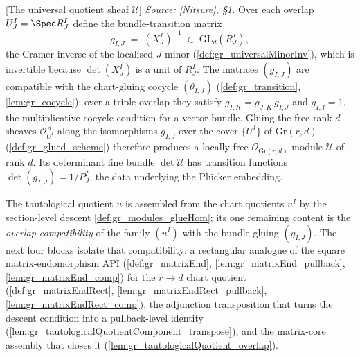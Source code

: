 \begin{definition}

[The universal quotient sheaf \(\mathcal{U}\)]
  \label{def:gr_universal_quotient_sheaf}
  \textit{Source: [Nitsure], \S 1.}
  Over each overlap \(U^I_J = \Spec R^I_J\) define the bundle-transition matrix
  \[
    g_{I,J} \;=\; (X^I_J)^{-1} \;\in\; \mathrm{GL}_d(R^I_J),
  \]
  the Cramer inverse of the localised \(J\)-minor (\cref{def:gr_universalMinorInv}),
  which is invertible because \(\det(X^I_J)\) is a unit of \(R^I_J\). The matrices
  \((g_{I,J})\) are compatible with the chart-gluing cocycle \((\theta_{I,J})\)
  (\cref{def:gr_transition}, \cref{lem:gr_cocycle}): over a triple overlap they
  satisfy \(g_{I,K} = g_{J,K}\, g_{I,J}\) and \(g_{I,I} = 1\), the multiplicative
  cocycle condition for a vector bundle. Gluing the free rank-\(d\) sheaves
  \(\mathcal{O}_{U^I}^{\,d}\) along the isomorphisms \(g_{I,J}\) over the cover
  \(\{U^I\}\) of \(\mathrm{Gr}(r,d)\) (\cref{def:gr_glued_scheme}) therefore
  produces a locally free \(\mathcal{O}_{\mathrm{Gr}(r,d)}\)-module
  \(\mathcal{U}\) of rank \(d\). Its determinant line bundle \(\det \mathcal{U}\)
  has transition functions \(\det(g_{I,J}) = 1/P^I_J\), the data underlying the
  Pl\"ucker embedding.
\end{definition}

The tautological quotient \(u\) is assembled from the chart quotients \(u^I\) by the
section-level descent \cref{def:gr_modules_glueHom}; its one remaining content is the
\emph{overlap-compatibility} of the family \((u^I)\) with the bundle gluing
\((g_{I,J})\). The next four blocks isolate that compatibility: a rectangular analogue of
the square matrix-endomorphism API (\cref{def:gr_matrixEnd},
\cref{lem:gr_matrixEnd_pullback}, \cref{lem:gr_matrixEnd_comp}) for the
\(r \to d\) chart quotient (\cref{def:gr_matrixEndRect},
\cref{lem:gr_matrixEndRect_pullback}, \cref{lem:gr_matrixEndRect_comp}), the
adjunction transposition that turns the descent condition into a pullback-level identity
(\cref{lem:gr_tautologicalQuotientComponent_transpose}), and the matrix-core assembly
that closes it (\cref{lem:gr_tautologicalQuotient_overlap}).

